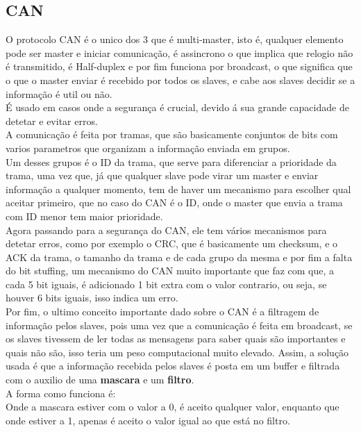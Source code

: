 \documentclass[a4paper, 11pt, onecolumn, oneside]{scrartcl}
\begin{document}
\subsection{CAN}
O protocolo CAN é o unico dos 3 que é multi-master, isto é, qualquer elemento pode ser master e iniciar comunicação, é assincrono o que implica que 
relogio não é transmitido, é Half-duplex e por fim funciona por broadcast, o que significa que o que o master enviar é recebido por todos os slaves, e cabe aos slaves
decidir se a informação é util ou não.\\
É usado em casos onde a segurança é crucial, devido á sua grande capacidade de detetar e evitar erros.\\
\newline
A comunicação é feita por tramas, que são basicamente conjuntos de bits com varios parametros que organizam a informação enviada em grupos.\\
Um desses grupos é o ID da trama, que serve para diferenciar a prioridade da trama, uma vez que, já que qualquer slave pode virar um master e enviar informação a qualquer momento,
tem de haver um mecanismo para escolher qual aceitar primeiro, que no caso do CAN é o ID, onde o master que envia a trama com ID menor tem maior prioridade.\\
\newline
Agora passando para a segurança do CAN, ele tem vários mecanismos para detetar erros, como por exemplo o CRC, que é basicamente um checksum, e o ACK da trama, o tamanho da trama e 
de cada grupo da mesma e por fim a falta do bit stuffing, um mecanismo do CAN muito importante que faz com que, a cada 5 bit iguais, é adicionado 1 bit extra com o valor contrario,
ou seja, se houver 6 bits iguais, isso indica um erro.\\
\newline
Por fim, o ultimo conceito importante dado sobre o CAN é a filtragem de informação pelos slaves, pois uma vez que a comunicação é feita em broadcast, se os slaves tivessem de ler todas 
as mensagens para saber quais são importantes e quais não são, isso teria um peso computacional muito elevado. Assim, a solução usada é que a informação recebida pelos slaves é posta em um 
buffer e filtrada com o auxilio de uma \textbf{mascara} e um \textbf{filtro}.\\
A forma como funciona é:\\
Onde a mascara estiver com o valor a 0, é aceito qualquer valor, enquanto que onde estiver a 1, apenas é aceito o valor igual ao que está no filtro. 
\end{document}
